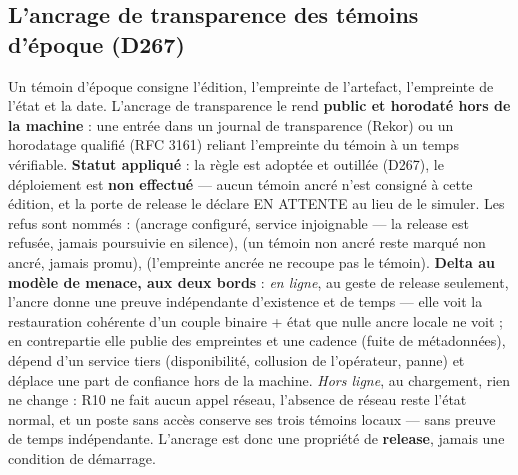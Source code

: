 \subsection{L'ancrage de transparence des témoins d'époque (D267)}\label{sec:transparence}

Un témoin d'époque consigne l'édition, l'empreinte de l'artefact, l'empreinte de l'état et
la date. L'ancrage de transparence le rend \textbf{public et horodaté hors de la machine} :
une entrée dans un journal de transparence (Rekor) ou un horodatage qualifié (RFC 3161)
reliant l'empreinte du témoin à un temps vérifiable. \textbf{Statut appliqué} : la règle est
adoptée et outillée (D267), le déploiement est \textbf{non effectué} — aucun témoin ancré
n'est consigné à cette édition, et la porte de release le déclare EN ATTENTE au lieu de le
simuler. Les refus sont nommés :  (ancrage configuré, service
injoignable — la release est refusée, jamais poursuivie en silence), 
(un témoin non ancré reste marqué non ancré, jamais promu), 
(l'empreinte ancrée ne recoupe pas le témoin). \textbf{Delta au modèle de menace, aux deux
bords} : \emph{en ligne}, au geste de release seulement, l'ancre donne une preuve
indépendante d'existence et de temps — elle voit la restauration cohérente d'un couple
binaire + état que nulle ancre locale ne voit ; en contrepartie elle publie des empreintes
et une cadence (fuite de métadonnées), dépend d'un service tiers (disponibilité, collusion
de l'opérateur, panne) et déplace une part de confiance hors de la machine. \emph{Hors
ligne}, au chargement, rien ne change : R10 ne fait aucun appel réseau, l'absence de réseau
reste l'état normal, et un poste sans accès conserve ses trois témoins locaux — sans preuve
de temps indépendante. L'ancrage est donc une propriété de \textbf{release}, jamais une
condition de démarrage.
